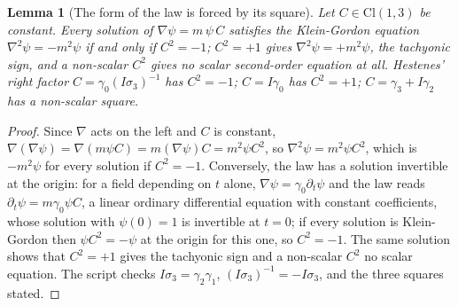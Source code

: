 \documentclass[11pt]{article}
\newtheorem{lemma}[theorem]{Lemma}
\theoremstyle{definition}
\theoremstyle{plain}
\providecommand{\Cl}{}\renewcommand{\Cl}{\mathrm{Cl}}
\begin{document}
\begin{lemma}[The form of the law is forced by its square]\label{c:one-relation.form-law-forced-square}
Let $C \in \Cl(1,3)$ be constant. Every solution of $\nabla\psi = m\,\psi\,C$ satisfies the Klein-Gordon equation $\nabla^{2}\psi = -m^{2}\psi$ if and only if $C^{2} = -1$; $C^{2} = +1$ gives $\nabla^{2}\psi = +m^{2}\psi$, the tachyonic sign, and a non-scalar $C^{2}$ gives no scalar second-order equation at all. Hestenes' right factor $C = \gamma_{0}(I\sigma_{3})^{-1}$ has $C^{2} = -1$; $C = I\gamma_{0}$ has $C^{2} = +1$; $C = \gamma_{3} + I\gamma_{2}$ has a non-scalar square.
\end{lemma}
\begin{proof}
Since $\nabla$ acts on the left and $C$ is constant, $\nabla(\nabla\psi) = \nabla(m\psi C) = m(\nabla\psi)C = m^{2}\psi C^{2}$, so $\nabla^{2}\psi = m^{2}\psi C^{2}$, which is $-m^{2}\psi$ for every solution if $C^{2} = -1$. Conversely, the law has a solution invertible at the origin: for a field depending on $t$ alone, $\nabla\psi = \gamma_{0}\partial_{t}\psi$ and the law reads $\partial_{t}\psi = m\gamma_{0}\psi C$, a linear ordinary differential equation with constant coefficients, whose solution with $\psi(0) = 1$ is invertible at $t = 0$; if every solution is Klein-Gordon then $\psi C^{2} = -\psi$ at the origin for this one, so $C^{2} = -1$. The same solution shows that $C^{2} = +1$ gives the tachyonic sign and a non-scalar $C^{2}$ no scalar equation. The script checks $I\sigma_{3} = \gamma_{2}\gamma_{1}$, $(I\sigma_{3})^{-1} = -I\sigma_{3}$, and the three squares stated.

\end{proof}
\end{document}
